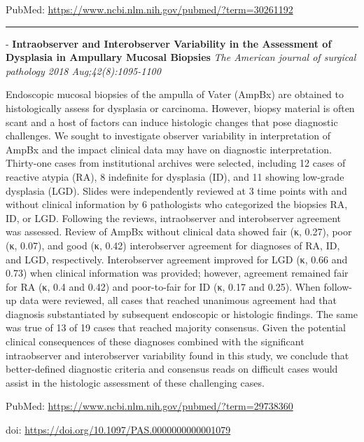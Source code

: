 \documentclass[]{article}
\begin{document}
PubMed: \url{https://www.ncbi.nlm.nih.gov/pubmed/?term=30261192}

{}

{}

\begin{center}\rule{0.5\linewidth}{\linethickness}\end{center}

 - \textbf{Intraobserver and Interobserver Variability in the Assessment
of Dysplasia in Ampullary Mucosal Biopsies} \emph{The American journal
of surgical pathology 2018 Aug;42(8):1095-1100}

Endoscopic mucosal biopsies of the ampulla of Vater (AmpBx) are obtained
to histologically assess for dysplasia or carcinoma. However, biopsy
material is often scant and a host of factors can induce histologic
changes that pose diagnostic challenges. We sought to investigate
observer variability in interpretation of AmpBx and the impact clinical
data may have on diagnostic interpretation. Thirty-one cases from
institutional archives were selected, including 12 cases of reactive
atypia (RA), 8 indefinite for dysplasia (ID), and 11 showing low-grade
dysplasia (LGD). Slides were independently reviewed at 3 time points
with and without clinical information by 6 pathologists who categorized
the biopsies RA, ID, or LGD. Following the reviews, intraobserver and
interobserver agreement was assessed. Review of AmpBx without clinical
data showed fair (κ, 0.27), poor (κ, 0.07), and good (κ, 0.42)
interobserver agreement for diagnoses of RA, ID, and LGD, respectively.
Interobserver agreement improved for LGD (κ, 0.66 and 0.73) when
clinical information was provided; however, agreement remained fair for
RA (κ, 0.4 and 0.42) and poor-to-fair for ID (κ, 0.17 and 0.25). When
follow-up data were reviewed, all cases that reached unanimous agreement
had that diagnosis substantiated by subsequent endoscopic or histologic
findings. The same was true of 13 of 19 cases that reached majority
consensus. Given the potential clinical consequences of these diagnoses
combined with the significant intraobserver and interobserver
variability found in this study, we conclude that better-defined
diagnostic criteria and consensus reads on difficult cases would assist
in the histologic assessment of these challenging cases.

PubMed: \url{https://www.ncbi.nlm.nih.gov/pubmed/?term=29738360}

doi: \url{https://doi.org/10.1097/PAS.0000000000001079}

{}
\end{document}
